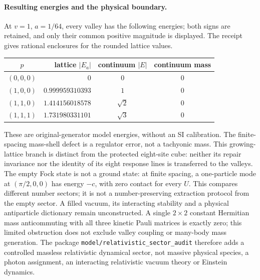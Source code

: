 \paragraph{Resulting energies and the physical boundary.}
At $v=1$, $a=1/64$, every valley has the following energies; both signs
are retained, and only their common positive magnitude is displayed.
The receipt gives rational enclosures for the rounded lattice values.
\begin{center}
\begin{tabular}{c r c c}
$p$ & lattice $|E_a|$ & continuum $|E|$ & continuum mass\\\hline
$(0,0,0)$ & $0$ & $0$ & $0$\\
$(1,0,0)$ & $0.999959310393$ & $1$ & $0$\\
$(1,1,0)$ & $1.414156018578$ & $\sqrt2$ & $0$\\
$(1,1,1)$ & $1.731980331101$ & $\sqrt3$ & $0$
\end{tabular}
\end{center}
These are original-generator model energies, without an SI calibration.
The finite-spacing mass-shell defect is a regulator error, not a
tachyonic mass.  This growing-lattice branch is distinct from the protected
eight-site cube: neither its repair invariance nor the identity of its
eight response lines is transferred to the valleys.
The empty Fock state is not a ground state: at finite spacing,
a one-particle mode at $(\pi/2,0,0)$ has energy $-c$, with zero contact
for every $U$.  This compares different number sectors; it is not a
number-preserving extraction protocol from the empty sector.  A filled
vacuum, its interacting stability and a physical antiparticle dictionary
remain unconstructed.  A single $2\times2$ constant Hermitian mass
anticommuting with all three kinetic Pauli matrices is exactly zero;
this limited obstruction does not exclude valley coupling or many-body
mass generation.  The package \texttt{model/relativistic\_sector\_audit}
therefore adds a controlled massless relativistic dynamical sector,
not massive physical species, a photon assignment, an interacting
relativistic vacuum theory or Einstein dynamics.
